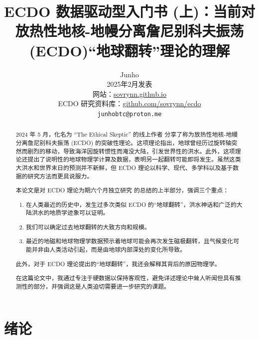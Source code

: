\documentclass[10pt,twocolumn,letterpaper]{article}
\begin{document}
\title{ECDO 数据驱动型入门书 (上)：当前对放热性地核-地幔分离詹尼别科夫振荡 (ECDO)“地球翻转”理论的理解}

\author{Junho\\
2025年2月发表\\
网站：\href{https://sovrynn.github.io}{sovrynn.github.io}\\
ECDO 研究资料库：\href{https://github.com/sovrynn/ecdo}{github.com/sovrynn/ecdo}\\
{\tt\small junhobtc@proton.me}
}

\maketitle

\begin{abstract}
2024 年 5 月，化名为 “The Ethical Skeptic” 的线上作者 \cite{0} 分享了称为放热性地核-地幔分离詹尼别科夫振荡 (ECDO) 的突破性理论\cite{1}。这项理论指出，地球曾经历过旋转轴突然而剧烈的移动，导致海洋因旋转惯性而淹没大陆，引发世界性的洪水。此外，这项理论还提出了说明性的地球物理学计算及数据，表明另一起翻转可能即将发生。虽然这类大洪水和世界末日的预测并不新鲜，但 ECDO 理论以科学、现代、多学科以及基于数据的研究方法而更具说服力。

本论文是对 ECDO 理论为期六个月独立研究 \cite{2,20} 的总结的上半部分，强调三个重点：

\begin{flushleft}
\begin{enumerate}
    \item 在人类最近的历史中，发生过多次类似 ECDO 的“地球翻转”，洪水神话和广泛的大陆洪水的地质学迹象可以证明。
    \item 我们可以确定过去地球翻转的大致方向和规模。
    \item 最近的地磁和地球物理学数据预示着地球可能会再次发生磁极翻转，且气候变化可能并非由人类活动引起，而是由地球内部深处的变化所导致。
\end{enumerate}
\end{flushleft}

此外，对于 ECDO 理论提出的“地球翻转”，我还会解释其背后的原因物理学。

在这篇论文中，我通过专注于硬数据以保持客观性，避免详述理论中耸人听闻但具有推测性的部分，并强调这是人类迫切需要进一步研究的课题。
\end{abstract}

\section{绪论}
\end{document}
